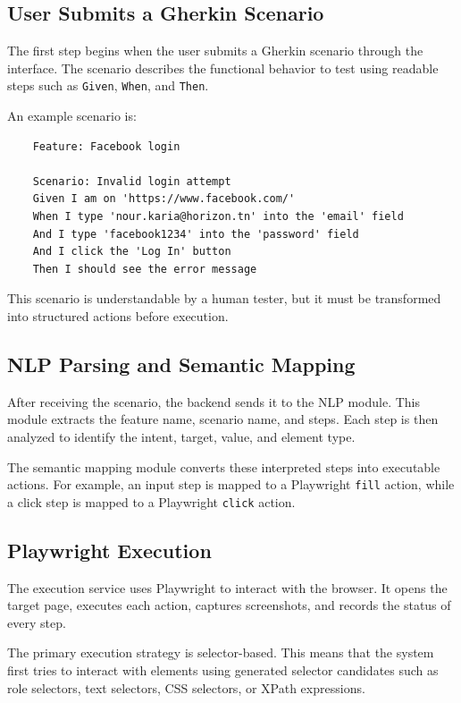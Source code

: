 \subsection{User Submits a Gherkin Scenario}
\label{subsec:user_submits_gherkin}

The first step begins when the user submits a Gherkin scenario through the interface. The scenario describes the functional behavior to test using readable steps such as \texttt{Given}, \texttt{When}, and \texttt{Then}.

An example scenario is:

\begin{verbatim}
	Feature: Facebook login
	
	Scenario: Invalid login attempt
	Given I am on 'https://www.facebook.com/'
	When I type 'nour.karia@horizon.tn' into the 'email' field
	And I type 'facebook1234' into the 'password' field
	And I click the 'Log In' button
	Then I should see the error message
\end{verbatim}

This scenario is understandable by a human tester, but it must be transformed into structured actions before execution.

\subsection{NLP Parsing and Semantic Mapping}
\label{subsec:nlp_mapping_integration}

After receiving the scenario, the backend sends it to the NLP module. This module extracts the feature name, scenario name, and steps. Each step is then analyzed to identify the intent, target, value, and element type.

The semantic mapping module converts these interpreted steps into executable actions. For example, an input step is mapped to a Playwright \texttt{fill} action, while a click step is mapped to a Playwright \texttt{click} action.

\subsection{Playwright Execution}
\label{subsec:playwright_execution_integration}

The execution service uses Playwright to interact with the browser. It opens the target page, executes each action, captures screenshots, and records the status of every step.

The primary execution strategy is selector-based. This means that the system first tries to interact with elements using generated selector candidates such as role selectors, text selectors, CSS selectors, or XPath expressions.

